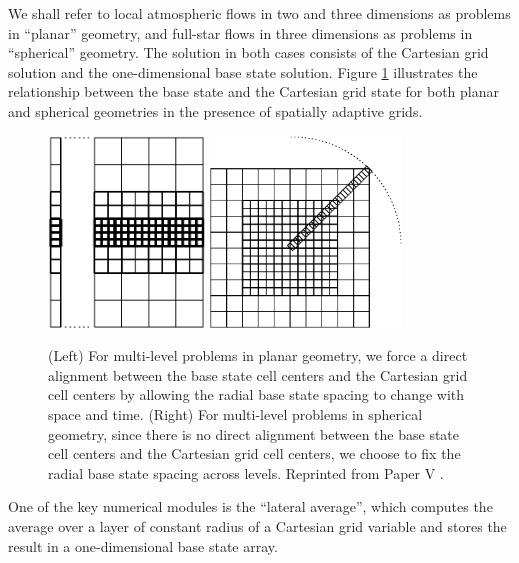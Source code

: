 \documentclass{aastex62}
\begin{document}
We shall refer to local atmospheric flows in two and three dimensions as problems in ``planar'' geometry, and full-star flows
in three dimensions as problems in ``spherical'' geometry.
The solution in both cases consists of the Cartesian grid solution
and the one-dimensional base state solution.
Figure \ref{Fig:BaseGrid} illustrates the relationship between the base state and the Cartesian grid state for both planar and spherical geometries in the presence of spatially adaptive grids. 
\begin{figure}[tb]
\centering
\includegraphics[height=2.0in]{base_grid.eps} \hspace{0.5in}
\includegraphics[height=2.0in]{base_spherical.eps}
\caption{\label{Fig:BaseGrid}  
(Left) For multi-level problems in planar geometry, we force a direct alignment
between the base state cell centers and the Cartesian grid cell centers by 
allowing the radial base state spacing to change with space and time.
(Right) For multi-level problems in spherical geometry, since there is no direct alignment
between the base state cell centers and the Cartesian grid cell centers, we choose to fix
the radial base state spacing across levels. Reprinted from Paper V \citep{MAESTRO_V}. }
\end{figure}
One of the key numerical modules is the ``lateral average'', which computes the average over a 
layer of constant radius of a Cartesian grid variable and stores the result in a one-dimensional base state array.
\end{document}
